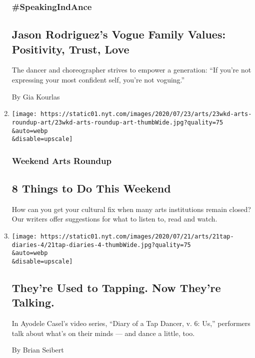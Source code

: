 \begin{enumerate}
  \hypertarget{speakingindance-1}{%
  \subsubsection{\#SpeakingIndAnce}\label{speakingindance-1}}

  \hypertarget{jason-rodriguezs-vogue-family-values-positivity-trust-love}{%
  \subsection{Jason Rodriguez's Vogue Family Values: Positivity, Trust,
  Love}\label{jason-rodriguezs-vogue-family-values-positivity-trust-love}}

  The dancer and choreographer strives to empower a generation: ``If
  you're not expressing your most confident self, you're not voguing.''

  By Gia Kourlas
\item
  \href{/2020/07/23/arts/things-to-do-weekend-coronavirus.html}{}

  \texttt{[image: https://static01.nyt.com/images/2020/07/23/arts/23wkd-arts-roundup-art/23wkd-arts-roundup-art-thumbWide.jpg?quality=75\\\&auto=webp\\\&disable=upscale]}

  \hypertarget{weekend-arts-roundup}{%
  \subsubsection{Weekend Arts Roundup}\label{weekend-arts-roundup}}

  \hypertarget{8-things-to-do-this-weekend}{%
  \subsection{8 Things to Do This
  Weekend}\label{8-things-to-do-this-weekend}}

  How can you get your cultural fix when many arts institutions remain
  closed? Our writers offer suggestions for what to listen to, read and
  watch.
\item
  \href{/2020/07/21/arts/dance/ayodele-casel-diary-of-a-tap-dancer.html}{}

  \texttt{[image: https://static01.nyt.com/images/2020/07/21/arts/21tap-diaries-4/21tap-diaries-4-thumbWide.jpg?quality=75\\\&auto=webp\\\&disable=upscale]}

  \hypertarget{theyre-used-to-tapping-now-theyre-talking}{%
  \subsection{They're Used to Tapping. Now They're
  Talking.}\label{theyre-used-to-tapping-now-theyre-talking}}

  In Ayodele Casel's video series, ``Diary of a Tap Dancer, v. 6: Us,''
  performers talk about what's on their minds --- and dance a little,
  too.

  By Brian Seibert
\end{enumerate}

